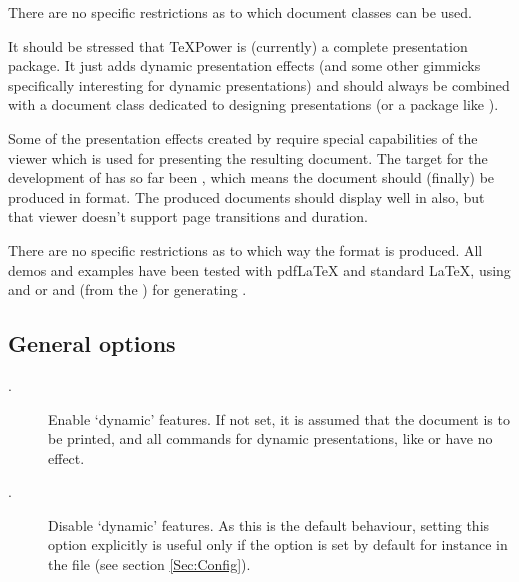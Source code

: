 \begin{slide}
There are no specific restrictions as to which document classes can be used.

It should be stressed that \TeX Power is  (currently) a complete presentation package. It just adds dynamic
presentation effects (and some other gimmicks specifically interesting for dynamic presentations) and should always be
combined with a document class dedicated to designing presentations (or a package like
\href{ftp://ftp.dante.de/tex-archive/help/Catalogue/entries/pdfslide.html}{}).

Some of the presentation effects created by  require special capabilities of the viewer which is used for
presenting the resulting document. The target for the development of  has so far been
\href{http://www.adobe.com/products/acrobat/readermain.html}%
{}, which means the
document should (finally) be produced in  format. The produced
 documents should display well in
\href{http://www.cs.wisc.edu/~ghost/gsview/}{} also, but that
viewer doesn't support page transitions and duration.

There are no specific restrictions as to which way the  format is produced. All demos and examples
have been tested with pdf\LaTeX{} and standard \LaTeX, using
 and \href{http://www.adobe.com/products/acrobat/}%
{}
or  and  (from the \href{http://www.ghostscript.com/}%
{}) for generating .

\newslide

\subsection{General options}\label{Sec:GenOpt}
\begin{description}
\item[.] Enable `dynamic' features. If not set, it is assumed that the document is to be
  printed, and all commands for dynamic presentations, like  or  have no effect.

\item[.] Disable `dynamic' features. As this is the default behaviour,
  setting this option explicitly is useful only if the option  is set by default for instance in the
   file (see section \ref{Sec:Config}).


\end{description}
\end{slide}
